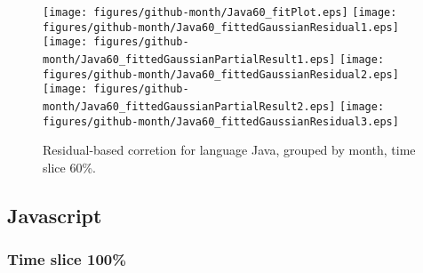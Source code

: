 \begin{figure}[t]
\centering
{}
{\texttt{[image: figures/github-month/Java60\_fitPlot.eps]}}
{\texttt{[image: figures/github-month/Java60\_fittedGaussianResidual1.eps]}}
{\texttt{[image: figures/github-month/Java60\_fittedGaussianPartialResult1.eps]}}
{\texttt{[image: figures/github-month/Java60\_fittedGaussianResidual2.eps]}}
{\texttt{[image: figures/github-month/Java60\_fittedGaussianPartialResult2.eps]}}
{\texttt{[image: figures/github-month/Java60\_fittedGaussianResidual3.eps]}}
\caption{Residual-based corretion for language Java, grouped by month, time slice 60\%.}
\end{figure}


\FloatBarrier


\subsection{Javascript}

\subsubsection{Time slice 100\%}

